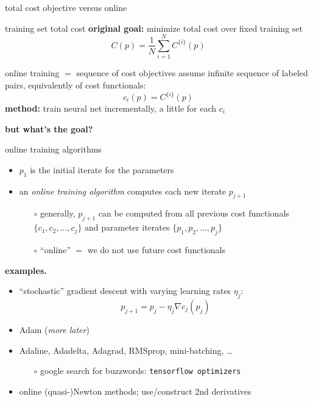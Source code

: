 \documentclass[xcolor={svgnames},
               hyperref={colorlinks,citecolor=DeepPink4,linkcolor=FireBrick,urlcolor=Maroon}]
               {beamer}
\newcommand{\grad}{\nabla}
\begin{document}
\begin{frame}{total cost objective versus online}

\begin{block}{training set total cost}
\textbf{original goal:}  minimize total cost over fixed training set
    $$C(p) = \frac{1}{N} \sum_{i=1}^N C^{\{i\}}(p)$$
\end{block}

\begin{block}{online training $=$ sequence of cost objectives}
assume infinite sequence of labeled pairs, equivalently of cost functionals:
    $$c_i(p) = C^{\{i\}}(p)$$
\textbf{method:} train neural net incrementally, a little for each $c_i$

\bigskip
\textbf{but what's the goal?}
\end{block}
\end{frame}


\begin{frame}{online training algorithms}

\begin{itemize}
\item $p_1$ is the initial iterate for the parameters
\item an \emph{online training algorithm} computes each new iterate $p_{j+1}$
    \begin{itemize}
    \item[$\circ$] generally, $p_{j+1}$ can be computed from all previous cost functionals $\{c_1,c_2,\dots,c_j\}$ and parameter iterates $\{p_1,p_2,\dots,p_j\}$
    \item[$\circ$] ``online'' $=$ we do not use future cost functionals
    \end{itemize}
\end{itemize}

\bigskip
\textbf{examples.}
\begin{itemize}
\item ``stochastic'' gradient descent with varying learning rates $\eta_j$:
   $$p_{j+1} = p_j - \eta_j \grad c_j(p_j)$$
\item Adam (\emph{more later})
\item Adaline, Adadelta, Adagrad, RMSprop, mini-batching, \dots
    \begin{itemize}
    \item[$\circ$] google search for buzzwords: \quad \texttt{tensorflow optimizers}
    \end{itemize}
\item online (quasi-)Newton methods; use/construct 2nd derivatives
\end{itemize}
\end{frame}
\end{document}

